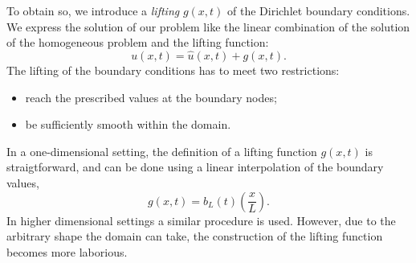 \documentclass[../../thesis.tex]{subfiles}
\begin{document}
To obtain so, we introduce a \emph{lifting} $g(x,t)$ of the Dirichlet boundary conditions.
We express the solution of our problem like the linear combination of the solution of the homogeneous problem and the lifting function:
\begin{equation}
    \label{eq:1d_fom_homogeneous_plus_lifting}
    u(x,t) = \hat{u}(x,t) + g(x,t).
\end{equation}
The lifting of the boundary conditions has to meet two restrictions:
\begin{itemize}
    \item reach the prescribed values at the boundary nodes;
    \item be sufficiently smooth within the domain.
\end{itemize}
In a one-dimensional setting, the definition of a lifting function $g(x,t)$ is straigtforward, 
and can be done using a linear interpolation of the boundary values,
\begin{equation}
    \label{eq:1d_fom_dirichlet_lifting}
    g(x,t) = b_L(t) \left(\frac{x}{L}\right).
\end{equation}
In higher dimensional settings a similar procedure is used. 
However, due to the arbitrary shape the domain can take, 
the construction of the lifting function becomes more laborious.
\end{document}
